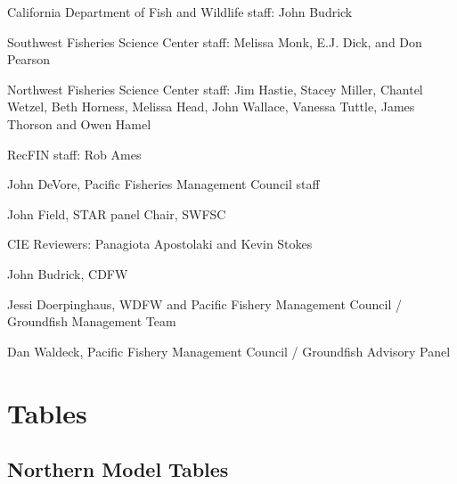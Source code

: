 \documentclass[12pt,]{article}
\begin{document}
California Department of Fish and Wildlife staff: John Budrick

Southwest Fisheries Science Center staff: Melissa Monk, E.J. Dick, and
Don Pearson

Northwest Fisheries Science Center staff: Jim Hastie, Stacey Miller,
Chantel Wetzel, Beth Horness, Melissa Head, John Wallace, Vanessa
Tuttle, James Thorson and Owen Hamel

RecFIN staff: Rob Ames

John DeVore, Pacific Fisheries Management Council staff

John Field, STAR panel Chair, SWFSC

CIE Reviewers: Panagiota Apostolaki and Kevin Stokes

John Budrick, CDFW

Jessi Doerpinghaus, WDFW and Pacific Fishery Management Council /
Groundfish Management Team

Dan Waldeck, Pacific Fishery Management Council / Groundfish Advisory
Panel

\newpage

\renewcommand{\thefigure}{\arabic{figure}}
\renewcommand{\thetable}{\arabic{table}}

\setcounter{figure}{0} \setcounter{table}{0} \newpage

\captionsetup[table]{labelformat=simple,format=plain,labelsep=period}

\section{Tables}\label{tables}

\subsection{Northern Model Tables}\label{northern-model-tables}
\end{document}

